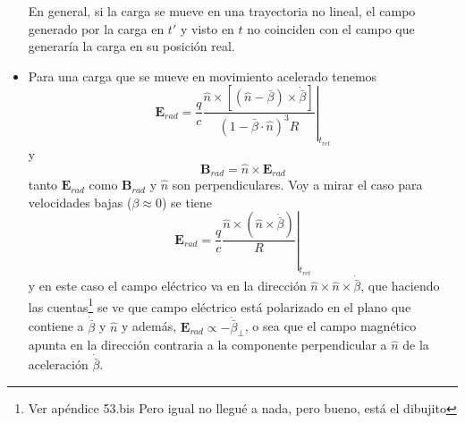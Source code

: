 \begin{itemize}
    \indent En general, si la carga se mueve en una trayectoria no lineal, el campo generado por la carga en $t'$ y visto en $t$ no coinciden con el campo que generaría la carga en su posición real.
    \item Para una carga que se mueve en movimiento acelerado tenemos
    \begin{equation*}
        \textbf{E}_{rad} = 
        \frac{q}{c}
        \left.
            \frac
            {
                \hat{n}\times
                \left[
                    (\hat{n} - \bar{\beta})\times \dot{\bar{\beta}}
                \right]
            }
            {
                (1 - \bar{\beta}\cdot \hat{n})^{3}R
            }
        \right|_{t_{ret}}
    \end{equation*}
    y 
    \begin{equation*}
        \textbf{B}_{rad} = \hat{n}\times\textbf{E}_{rad}
    \end{equation*}
    tanto $\textbf{E}_{rad}$ como $\textbf{B}_{rad}$ y $\hat{n}$ son perpendiculares. Voy a mirar el caso para velocidades bajas ($\beta \approx 0$) se tiene
    \begin{equation*}
        \textbf{E}_{rad} = \frac{q}{c}
        \left.
            \frac{\hat{n}\times (\hat{n}\times \dot{\bar{\beta}})}{R}
        \right|_{t_{ret}}
    \end{equation*}
    y en este caso el campo eléctrico va en la dirección $\hat{n}\times \hat{n}\times \dot{\bar{\beta}}$, que haciendo las cuentas\footnote{Ver apéndice 53.bis Pero igual no llegué a nada, pero bueno, está el dibujito} se ve que campo eléctrico está polarizado en el plano que contiene a $\dot{\bar{\beta}}$ y $\hat{n}$ y además, $\textbf{E}_{rad} \propto -\dot{\bar{\beta}}_{\perp}$, o sea que el campo magnético apunta en la dirección contraria a la componente perpendicular a $\hat{n}$ de la aceleración $\dot{\bar{\beta}}$.
\end{itemize}





